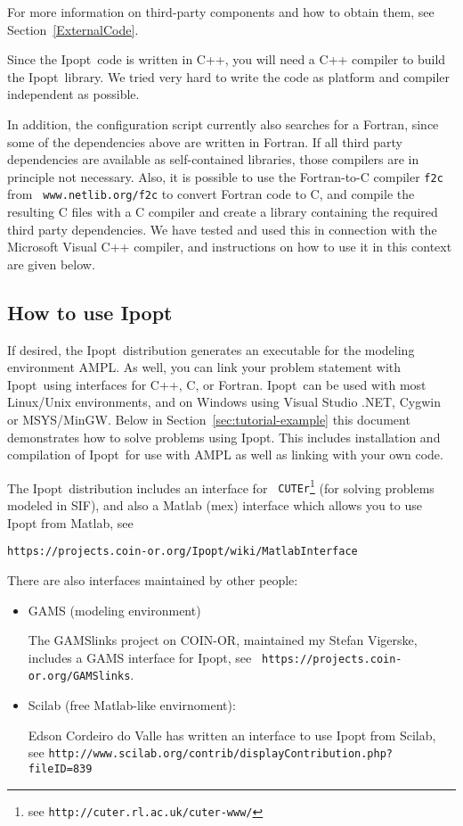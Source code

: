 \documentclass[10pt]{article}
\newcommand{\Ipopt}{{\sc Ipopt}}
\begin{document}
For more information on third-party components and how to obtain them,
see Section~\ref{ExternalCode}.

Since the \Ipopt\ code is written in C++, you will need a C++ compiler
to build the \Ipopt\ library.  We tried very hard to write the code as
platform and compiler independent as possible.

In addition, the configuration script currently also searches for a
Fortran, since some of the dependencies above are written in Fortran.
If all third party dependencies are available as self-contained
libraries, those compilers are in principle not necessary.  Also, it
is possible to use the Fortran-to-C compiler {\tt f2c} from {\tt
  www.netlib.org/f2c} to convert Fortran code to C, and compile the
resulting C files with a C compiler and create a library containing
the required third party dependencies.  We have tested and used this
in connection with the Microsoft Visual C++ compiler, and instructions
on how to use it in this context are given below.

\subsection{How to use \Ipopt}
If desired, the \Ipopt\ distribution generates an executable for the
modeling environment AMPL. As well, you can link your problem
statement with \Ipopt\ using interfaces for C++, C, or Fortran.
\Ipopt\ can be used with most Linux/Unix environments, and on Windows
using Visual Studio .NET, Cygwin or MSYS/MinGW.  Below in
Section~\ref{sec:tutorial-example} this document demonstrates how to
solve problems using \Ipopt. This includes installation and
compilation of \Ipopt\ for use with AMPL as well as linking with your
own code.

The \Ipopt\ distribution includes an interface for {\tt
  CUTEr}\footnote{see {\tt http://cuter.rl.ac.uk/cuter-www/}} (for
  solving problems modeled in SIF), and also a Matlab (mex) interface
  which allows you to use Ipopt from Matlab, see

\centerline{\tt https://projects.coin-or.org/Ipopt/wiki/MatlabInterface}


There are also interfaces maintained by other people:
\begin{itemize}
\item GAMS (modeling environment)

  The GAMSlinks project on COIN-OR, maintained my Stefan Vigerske,
  includes a GAMS interface for Ipopt, see {\tt
  https://projects.coin-or.org/GAMSlinks}.
\item Scilab (free Matlab-like envirnoment):

  Edson Cordeiro do Valle has written an interface to use Ipopt from
  Scilab,\\ see {\tt http://www.scilab.org/contrib/displayContribution.php?fileID=839}
\end{itemize}
\end{document}
